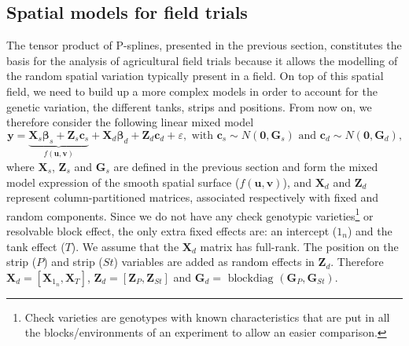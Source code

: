 \subsection{Spatial models for field trials}
The tensor product of P-splines, presented in the previous section, constitutes the basis for the analysis of agricultural field trials because it allows the modelling of the random spatial variation typically present in a field. 
On top of this spatial field, we need to build up a more complex models in order to account for the genetic variation, the different tanks, strips and positions. From now on, we therefore consider the following linear mixed model
\begin{equation}
    \boldsymbol{y}=
    \underbrace{
    	\boldsymbol{X}_{s} \boldsymbol{\beta}_{s}+
    	\boldsymbol{Z}_{s} \boldsymbol{c}_{s}
    	}_{f(\boldsymbol{u}, \boldsymbol{v})}+
    \boldsymbol{X}_{d} \boldsymbol{\beta}_{d}+
    \boldsymbol{Z}_{d} \boldsymbol{c}_{d}+
    \varepsilon, 
    \text { with } 
    \boldsymbol{c}_{s} \sim N\left(\mathbf{0}, \boldsymbol{G}_{s}\right) 
    \text { and } 
    \boldsymbol{c}_{d} \sim N\left(\mathbf{0}, \boldsymbol{G}_{d}\right)
    \text{,}
    \label{eq:full_random_and_additonal_effects_model}
\end{equation}
where $\boldsymbol{X}_{s}$, $\boldsymbol{Z}_{s}$ and $\boldsymbol{G}_{s}$ are defined in the previous section and form the mixed model expression of the smooth spatial surface ($f(\boldsymbol{u}, \boldsymbol{v})$), and $\boldsymbol{X}_{d}$ and $\boldsymbol{Z}_{d}$ represent column-partitioned matrices, associated respectively with fixed and random components. Since we do not have any check genotypic varieties\footnote{Check varieties are genotypes with known characteristics that are put in all the blocks/environments of an experiment to allow an easier comparison.} or resolvable block effect, the only extra fixed effects are: an intercept ($1_n$) and the tank effect ($T$). 
We assume that the $\boldsymbol{X}_{d}$ matrix has full-rank. 
The position on the strip ($P$) and strip ($St$) variables are added as random effects in $\mathbf{Z}_{d}$. 
Therefore $\mathbf{X}_{d} = 
\left[ 
	\mathbf{X}_{1_n},\mathbf{X}_{T} 
\right]$, 
$\boldsymbol{Z}_{d}=
\left[
	\boldsymbol{Z}_{P}, \boldsymbol{Z}_{St}
\right]$ and 
$\boldsymbol{G}_{d}= 
\text{ blockdiag }
\left(
	\boldsymbol{G}_{P}, \boldsymbol{G}_{St}
\right)$. 

